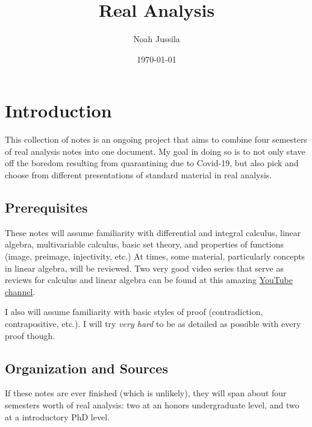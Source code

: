 \documentclass{article}
\title{Real Analysis}
\author{Noah Jussila}
\date{\today}
\theoremstyle{definition}
\begin{document}
	\maketitle
	
	\tableofcontents

\section{Introduction}
This collection of notes is an ongoing project that aims to combine four semesters of real analysis notes into one document. My goal in doing so is to not only stave off the boredom resulting from quarantining due to Covid-19, but also pick and choose from different presentations of standard material in real analysis. 
\subsection{Prerequisites}
These notes will assume familiarity with differential and integral calculus, linear algebra, multivariable calculus, basic set theory, and properties of functions (image, preimage, injectivity, etc.) At times, some material, particularly concepts in linear algebra, will be reviewed. Two very good video series that serve as reviews for calculus and linear algebra can be found at this amazing \href{https://www.youtube.com/channel/UCYO_jab_esuFRV4b17AJtAw}{YouTube channel}.

I also will assume familiarity with basic styles of proof (contradiction, contrapositive, etc.). I will try \textit{very hard} to be as detailed as possible with every proof though. 
\subsection{Organization and Sources}
If these notes are ever finished (which is unlikely), they will span about four semesters worth of real analysis: two at an honors undergraduate level, and two at a introductory PhD level. 
\end{document}

